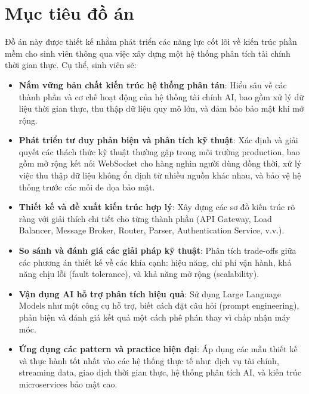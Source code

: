
\section*{Mục tiêu đồ án}

Đồ án này được thiết kế nhằm phát triển các năng lực cốt lõi về kiến trúc phần mềm cho sinh viên thông qua việc xây dựng một hệ thống phân tích tài chính thời gian thực. Cụ thể, sinh viên sẽ:

\begin{itemize}
    \item \textbf{Nắm vững bản chất kiến trúc hệ thống phân tán}: Hiểu sâu về các thành phần và cơ chế hoạt động của hệ thống tài chính AI, bao gồm xử lý dữ liệu thời gian thực, thu thập dữ liệu quy mô lớn, và đảm bảo bảo mật khi mở rộng.
    
    \item \textbf{Phát triển tư duy phản biện và phân tích kỹ thuật}: Xác định và giải quyết các thách thức kỹ thuật thường gặp trong môi trường production, bao gồm mở rộng kết nối WebSocket cho hàng nghìn người dùng đồng thời, xử lý việc thu thập dữ liệu không ổn định từ nhiều nguồn khác nhau, và bảo vệ hệ thống trước các mối đe dọa bảo mật.
    
    \item \textbf{Thiết kế và đề xuất kiến trúc hợp lý}: Xây dựng các sơ đồ kiến trúc rõ ràng với giải thích chi tiết cho từng thành phần (API Gateway, Load Balancer, Message Broker, Router, Parser, Authentication Service, v.v.).
    
    \item \textbf{So sánh và đánh giá các giải pháp kỹ thuật}: Phân tích trade-offs giữa các phương án thiết kế về các khía cạnh: hiệu năng, chi phí vận hành, khả năng chịu lỗi (fault tolerance), và khả năng mở rộng (scalability).
    
    \item \textbf{Vận dụng AI hỗ trợ phân tích hiệu quả}: Sử dụng Large Language Models như một công cụ hỗ trợ, biết cách đặt câu hỏi (prompt engineering), phản biện và đánh giá kết quả một cách phê phán thay vì chấp nhận máy móc.
    
    \item \textbf{Ứng dụng các pattern và practice hiện đại}: Áp dụng các mẫu thiết kế và thực hành tốt nhất vào các hệ thống thực tế như: dịch vụ tài chính, streaming data, giao dịch thời gian thực, hệ thống phân tích AI, và kiến trúc microservices bảo mật cao.
\end{itemize}

